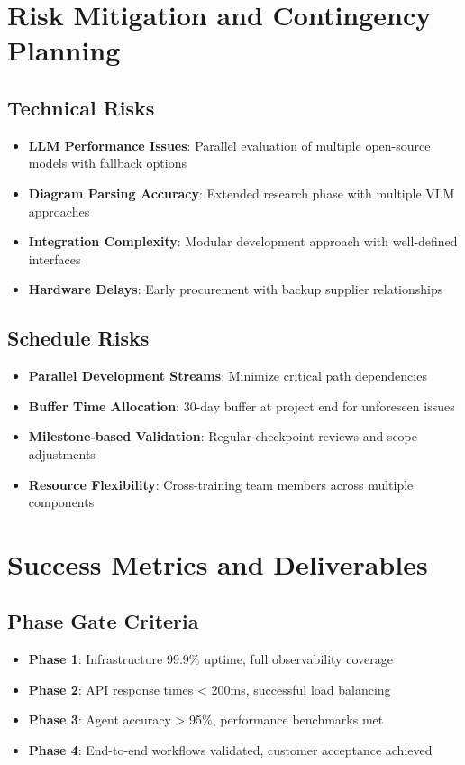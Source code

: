 \documentclass[12pt]{report}
\begin{document}
\section{Risk Mitigation and Contingency Planning}

\subsection{Technical Risks}
\begin{itemize}
  \item \textbf{LLM Performance Issues}: Parallel evaluation of multiple open-source models with fallback options
  \item \textbf{Diagram Parsing Accuracy}: Extended research phase with multiple VLM approaches
  \item \textbf{Integration Complexity}: Modular development approach with well-defined interfaces
  \item \textbf{Hardware Delays}: Early procurement with backup supplier relationships
\end{itemize}

\subsection{Schedule Risks}
\begin{itemize}
  \item \textbf{Parallel Development Streams}: Minimize critical path dependencies
  \item \textbf{Buffer Time Allocation}: 30-day buffer at project end for unforeseen issues
  \item \textbf{Milestone-based Validation}: Regular checkpoint reviews and scope adjustments
  \item \textbf{Resource Flexibility}: Cross-training team members across multiple components
\end{itemize}

\section{Success Metrics and Deliverables}

\subsection{Phase Gate Criteria}
\begin{itemize}
  \item \textbf{Phase 1}: Infrastructure 99.9\% uptime, full observability coverage
  \item \textbf{Phase 2}: API response times < 200ms, successful load balancing
  \item \textbf{Phase 3}: Agent accuracy > 95\%, performance benchmarks met
  \item \textbf{Phase 4}: End-to-end workflows validated, customer acceptance achieved
\end{itemize}
\end{document}
